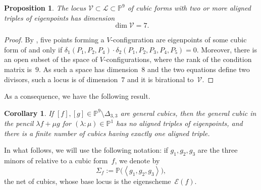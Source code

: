 \documentclass{amsart}
\theoremstyle{plain}
\newtheorem{prop}[lemma]{Proposition}
\newtheorem{corollary}[lemma]{Corollary}
\theoremstyle{definition}
\newtheorem{definition}[lemma]{Definition}
\newcommand{\p}{\mathbb{P}}
\newcommand{\sL}{\mathcal{L}}
\newcommand{\sV}{\mathcal{V}}
\newcommand{\Eig}[1]{\mathcal{E}\!\left( {#1} \right)}
\begin{document}
\begin{prop}
The locus $\sV \subset \sL \subset \p^9$ of cubic forms with two or more aligned triples of eigenpoints has dimension
%
$$
  \dim \sV = 7.
$$
%
\end{prop}
\begin{proof}
By , five points forming a $V$-configuration are eigenpoints of some cubic form of and only if $\delta_1 (P_1,P_2,P_4) \cdot
\delta_2 (P_1,P_2,P_3,P_4,P_5)=0$.
Moreover, there is an open subset of the space of $V$-configurations, where the rank of the condition matrix is~$9$. 
As such a space has dimension~$8$ and the two equations define two divisors, such a locus is of dimension~$7$ and it is birational to~$\sV$.
\end{proof}

As a consequence, we have the following result.

\begin{corollary}
\label{lemma:pencil_one_aligned}
If $[f],[g] \in \p^9 \setminus \Delta_{3,3}$ are general cubics,
then the general cubic in the pencil
$\lambda f + \mu g$ for $(\lambda: \mu) \in \p^1$ has no aligned triples of eigenpoints, and there is a finite number of cubics having exactly one aligned triple.
\end{corollary}

%

In what follows, we will use the following notation: if $g_1, g_2, g_3$ are the three minors of  relative
to a cubic form~$f$, we denote by
%
$$
  \Sigma_f := \p \bigl( \left\langle g_1, g_2, g_3 \right\rangle \bigr),
$$
%
the net of cubics, whose base locus is the eigenscheme~$\Eig{f}$.
\end{document}
